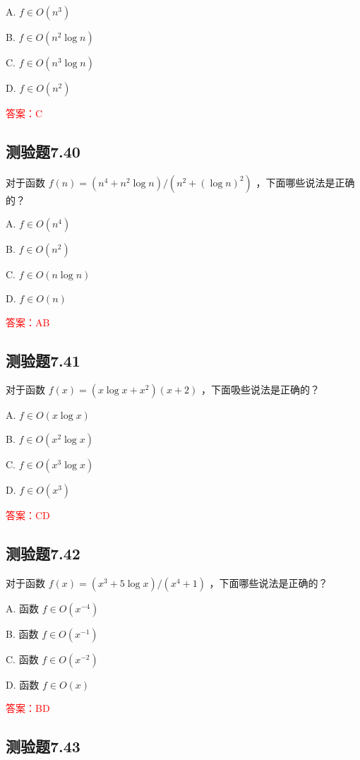 \documentclass[UTF8, heading=true]{ctexart}
\begin{document}
A. $f \in O\left(n^3\right)$

B. $f \in O\left(n^2 \log n\right)$

C. $f \in O\left(n^3 \log n\right)$

D. $f \in O\left(n^2\right)$


\textcolor{red}{答案：C}

\subsection{测验题7.40}

对于函数 $f(n)=\left(n^4+n^2 \log n\right) /\left(n^2+(\log n)^2\right)$ ，下面哪些说法是正确的？

A. $ f \in O\left(n^4\right)$

B. $ f \in O\left(n^2\right)$

C. $ f \in O(n \log n)$

D. $f \in O(n)$

\textcolor{red}{答案：AB}


\subsection{测验题7.41}

对于函数 $f(x)=\left(x \log x+x^2\right)(x+2)$ ，下面吸些说法是正确的？

A. $ f \in O(x \log x)$

B. $f \in O\left(x^2 \log x\right)$

C. $f \in O\left(x^3 \log x\right)$

D. $ f \in O\left(x^3\right)$

\textcolor{red}{答案：CD}

\subsection{测验题7.42}

对于函数 $f(x)=\left(x^3+5 \log x\right) /\left(x^4+1\right)$ ，下面哪些说法是正确的？

A. 函数 $f \in O\left(x^{-4}\right)$

B. 函数 $f \in O\left(x^{-1}\right)$

C. 函数 $f \in O\left(x^{-2}\right)$

D. 函数 $f \in O(x)$



\textcolor{red}{答案：BD}

\subsection{测验题7.43}
\end{document}
